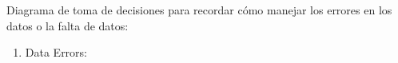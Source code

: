 Diagrama de toma de decisiones para recordar c\'omo manejar los errores en los datos o la falta de datos:

\begin{enumerate}
    \item Data Errors:

\end{enumerate}
